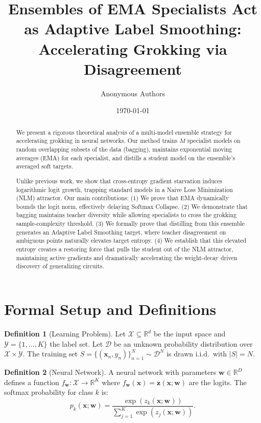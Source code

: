 \documentclass[11pt,a4paper]{article}
\title{\textbf{Ensembles of EMA Specialists Act as Adaptive Label Smoothing:\\ Accelerating Grokking via Disagreement}}
\author{Anonymous Authors}
\date{\today}
\theoremstyle{definition}
\newtheorem{definition}{Definition}[section]
\theoremstyle{plain}
\theoremstyle{remark}
\newcommand{\X}{\mathcal{X}}
\newcommand{\Y}{\mathcal{Y}}
\newcommand{\D}{\mathcal{D}}
\newcommand{\R}{\mathbb{R}}
\newcommand{\w}{\mathbf{w}}
\newcommand{\x}{\mathbf{x}}
\newcommand{\z}{\mathbf{z}}
\begin{document}
\maketitle

\begin{abstract}
We present a rigorous theoretical analysis of a multi-model ensemble strategy for accelerating grokking in neural networks. Our method trains $M$ specialist models on random overlapping subsets of the data (bagging), maintains exponential moving averages (EMA) for each specialist, and distills a student model on the ensemble's averaged soft targets. 

Unlike previous work, we show that cross-entropy gradient starvation induces logarithmic logit growth, trapping standard models in a Naive Loss Minimization (NLM) attractor. Our main contributions: (1) We prove that EMA dynamically bounds the logit norm, effectively delaying Softmax Collapse. (2) We demonstrate that bagging maintains teacher diversity while allowing specialists to cross the grokking sample-complexity threshold. (3) We formally prove that distilling from this ensemble generates an Adaptive Label Smoothing target, where teacher disagreement on ambiguous points naturally elevates target entropy. (4) We establish that this elevated entropy creates a restoring force that pulls the student out of the NLM attractor, maintaining active gradients and dramatically accelerating the weight-decay driven discovery of generalizing circuits.
\end{abstract}

\section{Formal Setup and Definitions}
\label{sec:setup}

\begin{definition}[Learning Problem]
\label{def:learning-prob}
Let $\X \subseteq \R^d$ be the input space and $\Y = \{1, \dots, K\}$ the label set. Let $\D$ be an unknown probability distribution over $\X \times \Y$. The training set $S = \{(\x_n, y_n)\}_{n=1}^N \sim \D^N$ is drawn i.i.d.\ with $|S| = N$.
\end{definition}

\begin{definition}[Neural Network]
\label{def:nn}
A neural network with parameters $\w \in \R^D$ defines a function $f_{\w}: \X \to \R^K$ where $f_{\w}(\x) = \z(\x; \w)$ are the logits. The softmax probability for class $k$ is:
\[
p_k(\x; \w) = \frac{\exp(z_k(\x; \w))}{\sum_{j=1}^K \exp(z_j(\x; \w))}.
\]
\end{definition}
\end{document}
